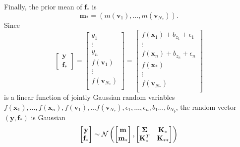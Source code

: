 Finally, the prior mean of $\mathbf{f}_*$ is 
\begin{equation*}
    \mathbf{m}_* = (m(\mathbf{v}_1), \dots, m(\mathbf{v}_{N_*})).
\end{equation*}
Since
\begin{equation*}
    \begin{bmatrix}
        \mathbf{y} \\ \mathbf{f}_{*}
    \end{bmatrix}
    =
    \begin{bmatrix}
        y_1 \\
        \vdots \\
        y_n \\
        f(\mathbf{v}_1) \\
        \vdots \\
        f(\mathbf{v}_{N_{*}}) \\
    \end{bmatrix}
    =
    \begin{bmatrix}
        f(\mathbf{x}_1) + b_{z_1} + \epsilon_1 \\
        \vdots \\
        f(\mathbf{x}_n) + b_{z_n} + \epsilon_n \\
        f(\mathbf{x}_*) \\
        \vdots \\
        f(\mathbf{v}_{N_{*}}) \\
    \end{bmatrix}
\end{equation*}
is a linear function of jointly Gaussian random variables $f(\mathbf{x}_1), \dots, f(\mathbf{x}_n), f(\mathbf{v}_1), \dots f(\mathbf{v}_{N_*}), \epsilon_1, \dots, \epsilon_n, b_1 \dots, b_{N_b}$,
the random vector $(\mathbf{y}, \mathbf{f}_*)$ is Gaussian
\begin{equation*}
    \begin{bmatrix}
        \mathbf{y} \\
        \mathbf{f}_*
    \end{bmatrix}
    \sim
    \mathcal{N}\left(
    \begin{bmatrix}
            \mathbf{m} \\
            \mathbf{m}_*
        \end{bmatrix}
    ,
    \begin{bmatrix}
            \boldsymbol{\Sigma} & \mathbf{K}_* \\
            \mathbf{K}_*^T & \mathbf{K}_{* *}
        \end{bmatrix}
    \right)
\end{equation*}
